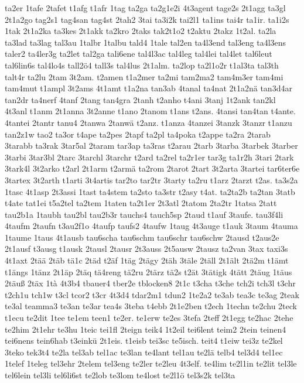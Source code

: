 {ta2er
1tafe
2tafet
t1afg
t1afr
1tag
ta2ga
ta2g1e2i
4t3agent
tage2s
2t1agg
ta3gl
2t1a2go
tag2s1
tag4san
tag4st
2tah2
3tai
ta3i2k
tai2l1
ta1ins
tai4r
ta1ir.
ta1i2s
1tak
2t1a2ka
ta3kes
2t1akk
ta2kro
2taks
tak2t1o2
t2aktu
2takz
1t2al.
ta2la
ta3lad
ta3lag
tal3au
1talbr
1talbu
tald4
1tale
tal2en
ta4l3end
tal3eng
ta4l3ens
taler2
ta4ler3g
ta2let
tal2ga
tali6ene
tal4l3ac
tal4leg
tal4lei
tal4let
tal6leut
tal6lin6s
tal4lo4s
tall2ö4
tall3s
tal4lus
2t1alm.
ta2lop
ta2l1o2r
t1al3ta
tal3th
talt4r
ta2lu
2tam
3t2am.
t2amen
t1a2mer
ta2mi
tam2ma2
tam4m3er
tam4mi
tam4mut
t1ampl
3t2ams
4t1amt
t1a2na
tan3ab
4tanal
ta4nat
2t1a2nä
tan3d4ar
tan2dr
ta4nerf
4tanf
2tang
tan4gra
2tanh
t2anho
t4ani
3tanj
1t2ank
tan2kl
4t3anl
t1anm
2t1anna
3t2anne
t1ano
2tanom
t1ans
t2ans.
4tansi
tan4tan
t4ante.
4tantei
2tantr
tanu4
2tanwa
2tanwä
t2anz.
t1anza
4tanzei
3tanzk
3tanzr
t1anzu
tan2z1w
tao2
ta3or
t4ape
ta2pes
2tapf
ta2pl
ta4poka
t2appe
ta2ra
2tarab
3tarabb
ta3rak
3tar5al
2taram
tar3ap
ta3ras
t2arau
2tarb
3tarba
3tarbek
3tarber
3tarbi
3tar3bl
2tarc
3tarchl
3tarchr
t2ard
ta2rel
ta2r1er
tar3g
ta1r2h
3tari
2tark
3tark4l
3t2arko
t2arl
2t1arm
t2armä
ta2rom
2tarot
2tart
3t2arta
3tartei
tar6ter6e
3tartex
3t2arth
t1arti
3t4artis
tar2to
tar2tr
3tarty
ta2ru
t1arz
2tarzt
t2as.
ta3s2a
1tasc
4t1asp
2t3assi
1tast
ta4stem
ta2sto
ta3str
t2asy
t4at.
ta2ta2b
ta2tan
3tatb
t4ate
tat1ei
t5a2tel
ta2tem
1taten
ta2t1er
2t3atl
2tatom
2ta2tr
1tatsa
2tatt
tau2b1a
1taubh
tau2bl
tau2b3r
tauchs4
tauch5sp
2taud
t1auf
3taufe.
tau3f4li
4taufm
2taufn
t3au2f1o
4taufp
taufs2
4taufw
1taug
4t3auge
t1auk
3taum
4tauma
1taume
1taus
4t1ausb
tau6scha
tau6schm
tau6schr
tau6schw
2tausd
t2aus2e
2t1ausf
t3ausg
t1ausk
2tausl
2tausr
2t3auss
2t5ausw
2tausz
ta2van
3tax
taxi3s
4t1axt
2tää
2täb
tä1c
2täd
t2äf
1täg
2tägy
2täh
3täle
2täll
2t1ält
2tä2m
t1ämt
t1ängs
1tänz
2t1äp
2täq
tä4reng
tä2ru
2tärz
tä2s
t2ät
3tätigk
4tätt
2täug
1täus
2täuß
2täx
1tà
4t3b4
tbauer4
tber2e
tblocken8
2t1c
t3cha
t3che
tch2i
tch3l
t3chr
t2ch1u
tch1w
t3cl
tcor2
t3cr
4t3d4
tdar2m1
tdun2
1te2a2
te3ab
tea3c
te3ag
2teak
te3al
teamma3
te3an
te3ar
tea4s
3teba
t4ebb
2t1e2ben
t2ech
1techn
te2chu
2teck
t1ecu
te2dit
1tee
te1em
teen1
te2er.
te1erw
te2es
3tefa
2teff
2t1egg
te2hac
2tehe
te2him
2t1ehr
te3hu
1teic
tei1fl
2teign
teik4
1t2eil
tei6lent
teim2
2tein
teinen4
tei6nens
tein6hab
t3einkü
2t1eis.
t1eisb
tei3sc
te5isch.
teit4
t1eiw
tei3z
te2kel
3teko
tek3t4
te2la
tel3ab
tel1ac
te3lan
te4lant
tel1au
te2lä
telb4
tel3d4
tel1ec
1telef
1teleg
tel3ehr
2telem
tel3eng
te2ler
te2leu
4t3elf.
te4lim
te2l1in
te2lit
tel3le
tel6lein
tel3li
tel6li6st
te2lob
te3lom
te4lost
te2l1ö
tel3s2k
tel3ta
}
